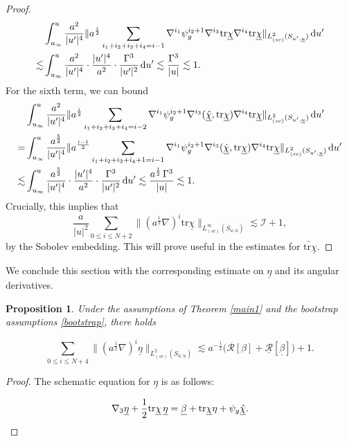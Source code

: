 \documentclass{amsart}
\newtheorem{proposition}{Proposition}[section]
\newcommand{\aln}{(\al \nabla)^i}
\newcommand{\hsp}{\hspace{.5mm}}
\newcommand{\intu}{\int_{u_{\infty}}^u}
\newcommand{\upr}{\lvert u^\prime \rvert}
\newcommand{\al}{a^{\frac{1}{2}}}
\newcommand{\chibar}{\underline{\chi}}
\newcommand{\chibarhat}{\underline{\hat{\chi}}}
\newcommand{\ubar}{\underline{u}}
\newcommand{\sumifi}{\sum_{i_1+i_2+i_3+i_4=i-1}}
\newcommand{\sumifim}{\sum_{i_1+i_2+i_3+i_4=i-2}}
\newcommand{\scaleinfinitySu}[1]{\lVert{#1} \rVert_{L^\infty_{(sc)}(S_{u,\ubar})}}
\newcommand{\tildetr}{\widetilde{\tr \chibar}}
\newcommand{\scaletwoSu}[1]{\lVert{#1} \rVert_{L^2_{(sc)}(S_{u,\ubar})}}
\newcommand{\scaletwoSuprime}[1]{\lVert{#1} \rVert_{L^2_{(sc)}(S_{u^\prime,\ubar})}}
\newcommand{\betabar}{\underline{\beta}}
\newcommand{\etabar}{\underline{\eta}}
\newcommand{\duprime}{\hspace{.5mm} \text{d}u^{\prime}}
\newcommand{\tr}{\mbox{tr}}
\begin{document}
{\begin{proof}
\begin{equation}
\begin{split}
        &\intu  \frac{a^2}{\upr^4}\scaletwoSuprime{a^{\frac{i}{2}} \sumifi \nabla^{i_1}\psi_g^{i_2+1} \nabla^{i_3}\tr\chibar \nabla^{i_4}\tr\chibar}\duprime\\ \lesssim& \intu\frac{a^2}{\upr^4}\cdot \frac{\upr^4}{a^2}\cdot \frac{\Gamma^3}{\upr^2}\duprime\lesssim \frac{\Gamma^3}{\lvert u \rvert}\lesssim 1.
\end{split}
\end{equation}For the sixth term, we can bound \begin{equation}
\begin{split}
        &\intu  \frac{a^2}{\upr^4}\scaletwoSuprime{a^{\frac{i}{2}} \sumifim \nabla^{i_1}\psi_g^{i_2+1} \nabla^{i_3}(\chibarhat, \tr\chibar) \nabla^{i_4}\tr\chibar}\duprime\\ =&\intu  \frac{a^\frac{5}{2}}{\upr^4}\scaletwoSuprime{a^{\frac{i-1}{2}} \sum_{i_1+i_2+i_3+i_4+1=i-1} \nabla^{i_1}\psi_g^{i_2+1} \nabla^{i_3}(\chibarhat, \tr\chibar) \nabla^{i_4}\tr\chibar}\duprime \\ \lesssim& \intu\frac{a^{\frac{5}{2}}}{\upr^4}\cdot \frac{\upr^4}{a^2}\cdot \frac{\Gamma^3}{\upr^2}\duprime\lesssim \frac{\al \hsp \Gamma^3}{\lvert u \rvert}\lesssim 1.
\end{split}
\end{equation}
Crucially, this implies that \begin{equation}
    \frac{a}{\lvert u \rvert^2}\sum_{0\leq i \leq N+2}\scaleinfinitySu{\aln \tr\chibar}\lesssim \mathcal{I}+1,
\end{equation}by the Sobolev embedding. This will prove useful in the estimates for $\tildetr$.	
\end{proof}
\noindent We conclude this section with the corresponding estimate on $\etabar$ and its angular derivatives.

\begin{proposition}
\label{etabarestimate}
    Under the assumptions of Theorem \ref{main1} and the bootstrap assumptions \eqref{bootstrap}, there holds
    
    \[ \sum_{0\leq i \leq N+4} \scaletwoSu{\aln \etabar} \lesssim a^{-\frac{1}{2}}\bigg(\mathcal{R}[\beta]+\underline{\mathcal{R}}[\betabar]\bigg)+1.\]
\end{proposition}
    \begin{proof}
    The schematic equation for $\etabar$ is as follows:
    
    \begin{equation} \nabla_3 \etabar + \frac{1}{2}\tr\chibar \hsp \etabar = \betabar + \tr\chibar \eta +\psi_g \chibarhat. \end{equation}
    

\end{proof}}
\end{document}
